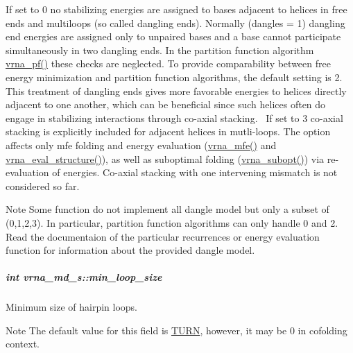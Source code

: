 If set to 0 no stabilizing energies are assigned to bases adjacent to helices in free ends and multiloops (so called dangling ends). Normally (dangles = 1) dangling end energies are assigned only to unpaired bases and a base cannot participate simultaneously in two dangling ends. In the partition function algorithm \hyperlink{group__pf__fold_ga29e256d688ad221b78d37f427e0e99bc}{vrna\+\_\+pf()} these checks are neglected. To provide comparability between free energy minimization and partition function algorithms, the default setting is 2. This treatment of dangling ends gives more favorable energies to helices directly adjacent to one another, which can be beneficial since such helices often do engage in stabilizing interactions through co-\/axial stacking.~\newline
If set to 3 co-\/axial stacking is explicitly included for adjacent helices in mutli-\/loops. The option affects only mfe folding and energy evaluation (\hyperlink{group__mfe__fold_gabd3b147371ccf25c577f88bbbaf159fd}{vrna\+\_\+mfe()} and \hyperlink{eval_8h_a58f199f1438d794a265f3b27fc8ea631}{vrna\+\_\+eval\+\_\+structure()}), as well as suboptimal folding (\hyperlink{group__subopt__wuchty_ga7988544ae3fc6334c1517cf76e5660aa}{vrna\+\_\+subopt()}) via re-\/evaluation of energies. Co-\/axial stacking with one intervening mismatch is not considered so far. \begin{DoxyNote}{Note}
Some function do not implement all dangle model but only a subset of (0,1,2,3). In particular, partition function algorithms can only handle 0 and 2. Read the documentaion of the particular recurrences or energy evaluation function for information about the provided dangle model. 
\end{DoxyNote}
\subparagraph[{\texorpdfstring{min\+\_\+loop\+\_\+size}{min_loop_size}}]{\setlength{\rightskip}{0pt plus 5cm}int vrna\+\_\+md\+\_\+s\+::min\+\_\+loop\+\_\+size}\hypertarget{group__model__details_a9ed7ba42fcc46915c5c0c524f3d255f5}{}\label{group__model__details_a9ed7ba42fcc46915c5c0c524f3d255f5}


Minimum size of hairpin loops. 

\begin{DoxyNote}{Note}
The default value for this field is \hyperlink{energy__const_8h_ae646250fd59311356c7e5722a81c3a96}{T\+U\+RN}, however, it may be 0 in cofolding context. 
\end{DoxyNote}


